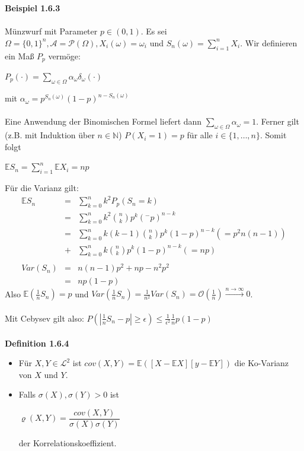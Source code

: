 \documentclass[10pt,a4paper]{report}
\numberwithin{equation}{section}
\numberwithin{figure}{section}
\theoremstyle{plain}
\theoremstyle{definition}
\theoremstyle{plain}
\theoremstyle{definition}
\theoremstyle{remark}
\theoremstyle{plain}
\begin{document}
\textbf{Beispiel 1.6.3}\\\\
Münzwurf mit Parameter $p \in (0,1)$. Es sei $\Omega=\{0,1\}^n, \mathcal{A}=\mathcal{P}(\Omega), X_i(\omega)=\omega_i$ und $S_n(\omega)=\sum\limits_{i=1}^n X_i$. Wir definieren ein Maß $P_p$ vermöge:
\begin{center}
$P_p(\cdot)=\sum\limits_{\omega \in \Omega}\alpha_\omega \delta_\omega(\cdot)$
\end{center} 
mit $\alpha_\omega=p^{S_n(\omega)}(1-p)^{n-S_n(\omega)}$\\\\
Eine Anwendung der Binomischen Formel liefert dann $\sum\limits_{\omega \in \Omega}\alpha_\omega=1$. Ferner gilt (z.B. mit Induktion über $n \in \mathbb{N}$) $P(X_i=1)=p$ für alle $i \in \{1,\dots,n\}$. Somit folgt
\begin{center}
$\mathbb{E}S_n=\sum\limits_{i=1}^n\mathbb{E}X_i=np$
\end{center}
Für die Varianz gilt:
\begin{eqnarray*}
\mathbb{E}S_n&=&\sum\limits_{k=0}^nk^2P_p(S_n=k)\\
&=& \sum\limits_{k=0}^nk^2\binom{n}{k}p^k(^-p)^{n-k}\\
&=&\sum\limits_{k=0}^nk(k-1)\binom{n}{k}p^k(1-p)^{n-k} (=p^2n(n-1))\\
&+& \sum\limits_{k=0}^n k\binom{n}{k}p^k(1-p)^{n-k} (=np)\\\\
Var(S_n)&=&n(n-1)p^2+np-n^2p^2\\
&=&np(1-p)
\end{eqnarray*}
Also $\mathbb{E}\left(\frac{1}{n}S_n\right)=p$ und $Var\left(\frac{1}{n}S_n\right)=\frac{1}{n^2}Var(S_n)=\mathcal{O}\left(\frac{1}{n}\right) \overset{n \to \infty}{\to} 0$.\\\\
Mit Cebysev gilt also: $P\left(\left|\frac{1}{n}S_n-p\right|\geq \epsilon\right)\leq \frac{1}{\epsilon^2}\frac{1}{n}p(1-p)$\\\\
\textbf{Definition 1.6.4}
\begin{itemize}
\item Für $X,Y \in \mathcal{L}^2$ ist $cov(X,Y)=\mathbb{E}([X-\mathbb{E}X][y-\mathbb{E}Y])$ die Ko-Varianz von $X$ und $Y$.
\item Falls $\sigma(X), \sigma(Y)>0$ ist
\begin{center}
$\varrho(X,Y)=\dfrac{cov(X,Y)}{\sigma(X)\sigma(Y)}$
\end{center}
der Korrelationskoeffizient.
\end{itemize}
\end{document}
